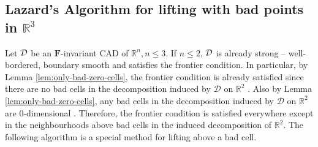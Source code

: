 \documentclass[
]{book}
\theoremstyle{definition}
\theoremstyle{definition}
\theoremstyle{definition}
\theoremstyle{definition}
\theoremstyle{remark}
\begin{document}
\hypertarget{lazards-algorithm-for-lifting-with-bad-points-in-mathbbr3}{%
\subsection{\texorpdfstring{Lazard's Algorithm for lifting with bad points in \(\mathbb{R}^3\)}{Lazard's Algorithm for lifting with bad points in \textbackslash mathbb\{R\}\^{}3}}\label{lazards-algorithm-for-lifting-with-bad-points-in-mathbbr3}}

Let \(\cal D\) be an \(\mathbf{F}\)-invariant CAD of \(\mathbb{R}^n, n \le 3\). If \(n \le 2\), \(\cal D\) is already strong -- well-bordered, boundary smooth and satisfies the frontier condition. In particular, by Lemma \ref{lem:only-bad-zero-cells}, the frontier condition is already satisfied since there are no bad cells in the decomposition induced by \(\mathcal{D}\) on \(\mathbb{R}^2\) \citep[Lemma 4.3]{lazard10}.
Also by Lemma \ref{lem:only-bad-zero-cells}, any bad cells in the decomposition induced by \(\mathcal{D}\) on \(\mathbb{R}^2\) are \(0\)-dimensional \citep[Lemma 4.3]{lazard10}.
Therefore, the frontier condition is satisfied everywhere except in the neighbourhoods above bad cells in the induced decomposition of \(\mathbb{R}^2\). The following algorithm is a special method for lifting above a bad cell.
\end{document}
